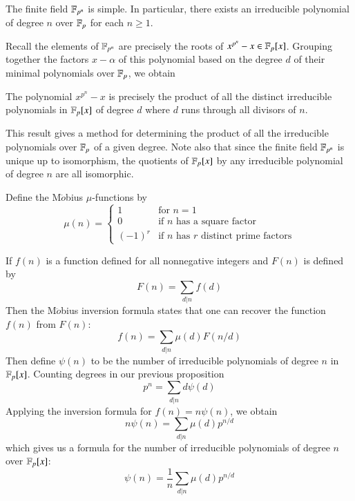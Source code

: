 \documentclass[12pt, a4paper, oneside, openright, titlepage]{book}
\begin{document}
\begin{prop}
    The finite field $\mathbb F_{p^n}$ is simple. In particular, there exists an irreducible polynomial of degree $n$ over $\mathbb F_p$ for each $n \geq 1$.
\end{prop}

Recall the elements of $\mathbb F_{p^n}$ are precisely the roots of $x^{p^n}-x \in \mathbb F_p[x]$. Grouping together the factors $x-\alpha$ of this polynomial based on the degree $d$ of their minimal polynomials over $\mathbb F_p$, we obtain
\begin{prop}
    The polynomial $x^{p^n}-x$ is precisely the product of all the distinct irreducible polynomials in $\mathbb F_p[x]$ of degree $d$ where $d$ runs through all divisors of $n$.
\end{prop}

This result gives a method for determining the product of all the irreducible polynomials over $\mathbb F_p$ of a given degree. Note also that since the finite field $\mathbb F_{p^n}$ is unique up to isomorphism, the quotients of $\mathbb F_p[x]$ by any irreducible polynomial of degree $n$ are all isomorphic. 

Define the M$\ddot{o}$bius $\mu$-functions by \begin{equation*}
    \mu(n) = \left\{\begin{array}{lc} 1 & \text{for } n = 1 \\ 0 & \text{if } n\text{ has a square factor} \\ (-1)^r & \text{if } n \text{ has } r \text{ distinct prime factors} \end{array}\right.
\end{equation*}

If $f(n)$ is a function defined for all nonnegative integers and $F(n)$ is defined by \begin{equation*}
    F(n) = \sum_{d\vert n}f(d)
\end{equation*}
Then the M$\ddot{o}$bius inversion formula states that one can recover the function $f(n)$ from $F(n)$: \begin{equation*}
    f(n) = \sum_{d\vert n}\mu(d)F(n/d)
\end{equation*}
Then define $\psi(n)$ to be the number of irreducible polynomials of degree $n$ in $\mathbb F_p[x]$. Counting degrees in our previous proposition \begin{equation*}
    p^n = \sum_{d\vert n}d\psi(d)
\end{equation*}
Applying the inversion formula for $f(n) = n\psi(n)$, we obtain \begin{equation*}
    n\psi(n) = \sum_{d\vert n}\mu(d)p^{n/d}
\end{equation*}
which gives us a formula for the number of irreducible polynomials of degree $n$ over $\mathbb F_p[x]$: \begin{equation*}
    \psi(n) = \frac{1}{n}\sum_{d\vert n}\mu(d)p^{n/d}
\end{equation*}
\end{document}
